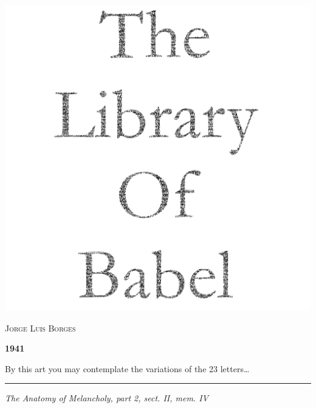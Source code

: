 \documentclass[oneside]{book}
\begin{document}
\begin{titlepage}
    \begin{center}
        \includegraphics[width=\linewidth]{Title.png}

        \vfill

        \textsc{\Large Jorge Luis Borges}\par
        \textbf{1941}
    \end{center}
\end{titlepage}

\pagestyle{empty}
\begin{center}
    \leavevmode\vfill
    
    By this art you may contemplate the variations of the 23 letters\dots \par
    \vspace*{.8em}
    \hrule
    \textit{The Anatomy of Melancholy, part 2, sect. II, mem. IV}
    
    \vfill
\end{center}
\newpage

\pagestyle{fancy}
\setcounter{page}{1}

\bigskip
\end{document}
